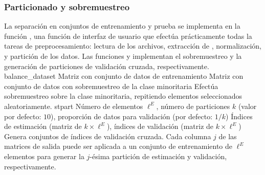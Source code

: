 %
\subsubsection{Particionado y sobremuestreo}
%
La separación en conjuntos de entrenamiento y prueba se implementa en
la función , una función de interfaz de usuario que
efectúa prácticamente todas la tareas de preprocesamiento: lectura de
los archivos, extracción de , normalización, y partición de
los datos.
Las funciones  y  implementan el
sobremuestreo y la generación de particiones de validación cruzada,
respectivamente.
%
\funcentry
    {balance\_dataset}
    {Matriz con conjunto de datos de entrenamiento}
    {Matriz con conjunto de datos con sobremuestreo de
      la clase minoritaria}
    {Efectúa sobremuestreo sobre la clase minoritaria, repitiendo
      elementos seleccionados aleatoriamente.}
%
\funcheader
    {stpart}
    {Número de elementos $\ell^E$, número de particiones $k$ (valor
      por defecto: $10$), proporción de datos para validación (por
      defecto: $1/k$)}
    {Índices de estimación (matriz de $k\times\ell^E$), índices de
      validación (matriz de $k\times\ell^E$)}
    {Genera conjuntos de índices de validación cruzada.  Cada columna
      $j$ de las matrices de salida puede ser aplicada a un conjunto
      de entrenamiento de $\ell^E$ elementos para generar la $j$-ésima
      partición de estimación y validación, respectivamente.}
%
